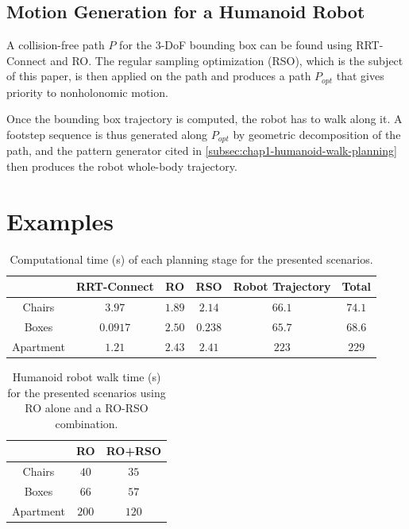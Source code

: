 \subsection{Motion Generation for a Humanoid Robot}

A collision-free path $P$ for the 3-DoF bounding box can be found
using RRT-Connect and RO. The regular sampling optimization (RSO),
which is the subject of this paper, is then applied on the path and
produces a path $P_{opt}$ that gives priority to nonholonomic motion.

Once the bounding box trajectory is computed, the robot has to walk
along it. A footstep sequence is thus generated along $P_{opt}$ by
geometric decomposition of the path, and the pattern generator cited
in \autoref{subsec:chap1-humanoid-walk-planning} then produces the robot
whole-body trajectory.

\section{Examples}
\label{sec:chap1-examples}

\begin{table}
\label{tab:chap1-computation-time}
\centering
\begin{tabular}{c|c|c|c|c|c|}
  \cline{2-6}
  & RRT-Connect & RO & RSO & Robot Trajectory & Total\\
  \hline
  \multicolumn{1}{|c|}{Chairs} & $3.97$ & $1.89$ & $2.14$ & $66.1$ & $74.1$\\
  \hline
  \multicolumn{1}{|c|}{Boxes} & $0.0917$ & $2.50$ & $0.238$ & $65.7$ & $68.6$\\
  \hline
  \multicolumn{1}{|c|}{Apartment} & $1.21$ & $2.43$ & $2.41$ & $223$ & $229$ \\
  \hline
\end{tabular}
\caption{Computational time (s) of each planning stage for the
  presented scenarios.}
\end{table}

\begin{table}
\label{tab:chap1-walk-time}
\centering
\begin{tabular}{c|c|c|}
  \cline{2-3}
  & RO & RO+RSO \\
  \hline
  \multicolumn{1}{|c|}{Chairs} & $40$ & $35$ \\
  \hline
  \multicolumn{1}{|c|}{Boxes} & $66$ & $57$ \\
  \hline
  \multicolumn{1}{|c|}{Apartment} & $200$ & $120$ \\
  \hline
\end{tabular}
\caption{Humanoid robot walk time (s) for the presented scenarios
  using RO alone and a RO-RSO combination.}
\end{table}

